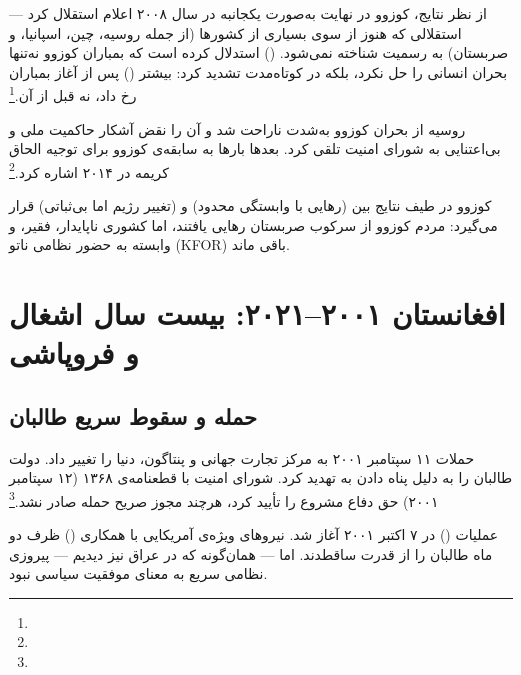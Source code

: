 از نظر نتایج، کوزوو در نهایت به‌صورت یکجانبه در سال ۲۰۰۸ اعلام استقلال کرد — استقلالی که هنوز از سوی بسیاری از کشورها (از جمله روسیه، چین، اسپانیا، و صربستان) به رسمیت شناخته نمی‌شود.  () استدلال کرده است که بمباران کوزوو نه‌تنها بحران انسانی را حل نکرد، بلکه در کوتاه‌مدت تشدید کرد: بیشتر  () پس از آغاز بمباران رخ داد، نه قبل از آن.\footnote{}

روسیه از بحران کوزوو به‌شدت ناراحت شد و آن را نقض آشکار حاکمیت ملی و بی‌اعتنایی به شورای امنیت تلقی کرد. بعدها  بارها به سابقه‌ی کوزوو برای توجیه الحاق کریمه در ۲۰۱۴ اشاره کرد.\footnote{}

کوزوو در طیف نتایج بین  (رهایی با وابستگی محدود) و  (تغییر رژیم اما بی‌ثباتی) قرار می‌گیرد: مردم کوزوو از سرکوب صربستان رهایی یافتند، اما کشوری ناپایدار، فقیر، و وابسته به حضور نظامی ناتو (KFOR) باقی ماند.


\section{افغانستان ۲۰۰۱–۲۰۲۱: بیست سال اشغال و فروپاشی}
\label{sec:ch10-afghanistan}

\subsection{حمله و سقوط سریع طالبان}
\label{subsec:ch10-afghan-invasion}

حملات ۱۱ سپتامبر ۲۰۰۱ به مرکز تجارت جهانی و پنتاگون، دنیا را تغییر داد. دولت  طالبان را به دلیل پناه دادن به  تهدید کرد. شورای امنیت با قطعنامه‌ی ۱۳۶۸ (۱۲ سپتامبر ۲۰۰۱) حق دفاع مشروع را تأیید کرد، هرچند مجوز صریح حمله صادر نشد.\footnote{}

عملیات  () در ۷ اکتبر ۲۰۰۱ آغاز شد. نیروهای ویژه‌ی آمریکایی با همکاری  () ظرف دو ماه طالبان را از قدرت ساقطدند. اما — همان‌گونه که در عراق نیز دیدیم — پیروزی نظامی سریع به معنای موفقیت سیاسی نبود.

